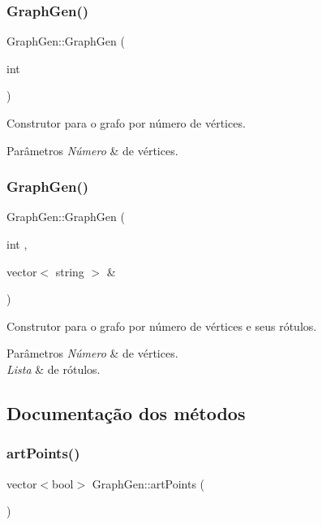 \subsubsection{\texorpdfstring{GraphGen()}{GraphGen()}\hspace{0.1cm}{\footnotesize\ttfamily [1/2]}}
{\footnotesize\ttfamily Graph\+Gen\+::\+Graph\+Gen (\begin{DoxyParamCaption}\item[{int}]{ }\end{DoxyParamCaption})}

Construtor para o grafo por número de vértices. 
\begin{DoxyParams}{Parâmetros}
{\em Número} & de vértices. \\
\hline
\end{DoxyParams}
\mbox{\label{classGraphGen_abdb70c362c414ff5a18ab3796126a1a9}} 
\subsubsection{\texorpdfstring{GraphGen()}{GraphGen()}\hspace{0.1cm}{\footnotesize\ttfamily [2/2]}}
{\footnotesize\ttfamily Graph\+Gen\+::\+Graph\+Gen (\begin{DoxyParamCaption}\item[{int}]{,  }\item[{vector$<$ string $>$ \&}]{ }\end{DoxyParamCaption})}

Construtor para o grafo por número de vértices e seus rótulos. 
\begin{DoxyParams}{Parâmetros}
{\em Número} & de vértices. \\
\hline
{\em Lista} & de rótulos. \\
\hline
\end{DoxyParams}


\subsection{Documentação dos métodos}
\mbox{\label{classGraphGen_abfc9e2946585f5ea7e2948cd724d37e8}} 
\subsubsection{\texorpdfstring{artPoints()}{artPoints()}}
{\footnotesize\ttfamily vector$<$bool$>$ Graph\+Gen\+::art\+Points (\begin{DoxyParamCaption}{ }\end{DoxyParamCaption})}

